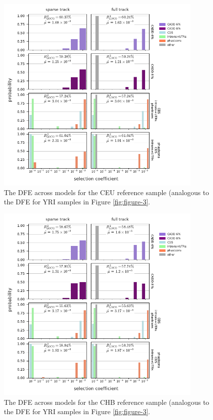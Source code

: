 \documentclass[11pt]{article}
\begin{document}
\begin{figure}[htbp]
  \centering
  \includegraphics[width=0.9\textwidth]{figures/supplementary/figure_ceu_dfe.pdf}
  \caption{The DFE across models for the CEU reference sample (analogous to the
  DFE for YRI samples in Figure \ref{fig:figure-3}.}
  \label{suppfig:dfe-ceu}
\end{figure}

\begin{figure}[htbp]
  \centering
  \includegraphics[width=0.9\textwidth]{figures/supplementary/figure_chb_dfe.pdf}
  \caption{The DFE across models for the CHB reference sample (analogous to the
  DFE for YRI samples in Figure \ref{fig:figure-3}.}
    \label{suppfig:dfe-chb}
\end{figure}
\end{document}
